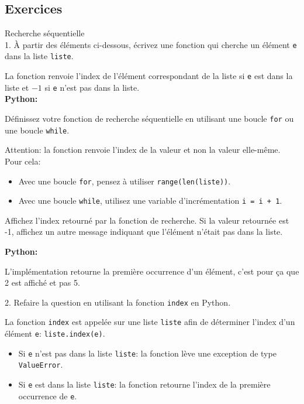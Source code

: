     \subsection{Exercices}
    
    \begin{Exercice}[20 minutes] [Python] Recherche séquentielle\\
    
    1. À partir des éléments ci-dessous, écrivez une fonction qui cherche un élément \texttt{e} dans la liste \texttt{liste}. \newline 
    
    La fonction renvoie l'index de l'élément correspondant de la liste si \texttt{e} est dans la liste et $-1$ si \texttt{e} n'est pas dans la liste.\\
    
    \textbf{Python:}
      


\begin{conseil}
    Définissez votre fonction de recherche séquentielle en utilisant une boucle \lstinline{for} ou une boucle \lstinline{while}.
    
    Attention: la fonction renvoie l'index de la valeur et non la valeur elle-même. Pour cela:
    \begin{itemize}
        \item Avec une boucle \lstinline{for}, pensez à utiliser \lstinline{range(len(liste))}.
        \item Avec une boucle \lstinline{while}, utilisez une variable d'incrémentation \lstinline{i = i + 1}.
    \end{itemize}
    Affichez l'index retourné par la fonction de recherche. Si la valeur retournée est -1, affichez un autre message indiquant que l'élément n'était pas dans la liste.  
\end{conseil}
        
    \begin{solution}
    \textbf{Python:}
    
    L'implémentation retourne la première occurrence d'un élément, c'est pour ça que 2 est affiché et pas 5.
    \end{solution}

    2. Refaire la question en utilisant la fonction \lstinline{index} en Python.

    \begin{conseil}
        La fonction \lstinline|index| est appelée sur une liste \texttt{liste} afin de déterminer l'index d'un élément \texttt{e}: \lstinline{liste.index(e)}.
        \begin{itemize}
            \item Si \texttt{e} n'est pas dans la liste \texttt{liste}: la fonction lève une exception de type \lstinline{ValueError}. 
            \item Si \texttt{e} est dans la liste \texttt{liste}: la fonction retourne l'index de la première occurrence de \texttt{e}.
        \end{itemize}
    \end{conseil}


\end{Exercice}
